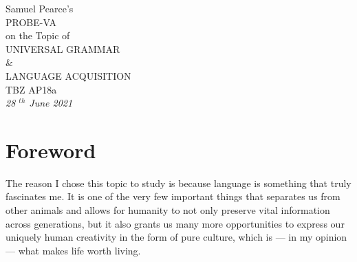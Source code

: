 \documentclass[a4paper,10pt]{article}
\begin{document}
\begingroup%
\centering
\vfill
\Large{Samuel Pearce's}\\
\huge{PROBE-VA}\\
\Large{on the Topic of}\\[\baselineskip]
\Huge{UNIVERSAL GRAMMAR}\\
\huge{\&}\\
\Huge{LANGUAGE ACQUISITION}\\[\baselineskip]
\large{TBZ AP18a}\\
\large{\emph{28 $^{th}$ June 2021}}\par
\vfill\null
\endgroup

\begin{abstract}
	The goal of this project was twofold: for one half, I intended to expand my knowledge on
	the topic of Chomsky's Universal Grammar theory by reading an introductory book on
	the matter and writing a paper summarising my findings and opinion on the concept. For the other
	half, I conducted an informal experiment with two participants in which I taught them both the language
	Toki Pona\footnotemark through two of the most common methods; one learnt through pure immersion,
	while the other learnt using the Toki Pona official course book. Finally, with the results of
	both halves of the project complete, I summarised my findings about universal grammar into a
	separate document and compiled the experiment results here alongside my reflection on the
	project as a whole.
\end{abstract}


\pagebreak


\tableofcontents
\pagebreak


\section{Foreword}
The reason I chose this topic to study is because language is something that truly fascinates me.
It is one of the very few important things that separates us from other animals and allows for humanity
to not only preserve vital information across generations, but it also
grants us many more opportunities to express our uniquely human creativity in the form of pure
culture, which is --- in my opinion --- what makes life worth living.
\end{document}
